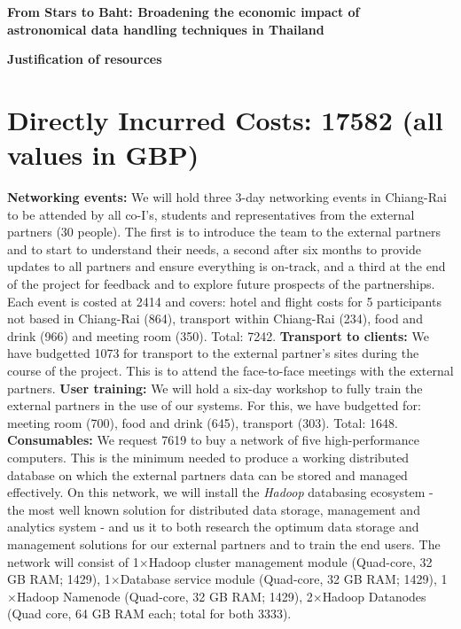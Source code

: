 \documentclass[11pt]{article}
\begin{document}
\setcounter{figure}{0}
\noindent
{\LARGE \bf From Stars to Baht: Broadening the economic impact of \\
astronomical data handling techniques in Thailand}

\vspace{3mm}
\noindent
{\LARGE \bf Justification of resources }
\vspace{-3mm}
\section{Directly Incurred Costs: 17582 (all values in GBP)}
\vspace{-3mm}
{\bf Networking events:} We will hold three 3-day networking events in Chiang-Rai to be attended by all co-I's, students and representatives from the external partners (30 people). The first is to introduce the team to the external partners and to start to understand their needs, a second after six months to provide updates to all partners and ensure everything is on-track, and a third at the end of the project for feedback and to explore future prospects of the partnerships. Each event is costed at 2414 and covers: hotel and flight costs for 5 participants not based in Chiang-Rai (864), transport within Chiang-Rai (234), food and drink (966) and meeting room (350). Total: 7242. {\bf Transport to clients:} We have budgetted 1073 for transport to the external partner's sites during the course of the project. This is to attend the face-to-face meetings with the external partners. {\bf User training:} We will hold a six-day workshop to fully train the external partners in the use of our systems. For this, we have budgetted for: meeting room (700), food and drink (645), transport (303). Total: 1648. {\bf Consumables:} We request 7619 to buy a network of five high-performance computers. This is the minimum needed to produce a working distributed database on which the external partners data can be stored and managed effectively. On this network, we will install the {\it Hadoop} databasing ecosystem - the most well known solution for distributed data storage, management and analytics system - and us it to both research the optimum data storage and management solutions for our external partners and to train the end users. The network will consist of 1$\times$Hadoop cluster management module (Quad-core, 32 GB RAM; 1429), 1$\times$Database service module (Quad-core, 32 GB RAM; 1429), 1$\times$Hadoop Namenode (Quad-core, 32 GB RAM; 1429), 2$\times$Hadoop Datanodes (Quad core, 64 GB RAM each; total for both 3333).
\end{document}
